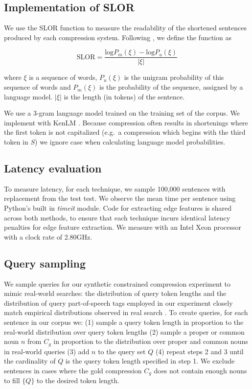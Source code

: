 \subsection{Implementation of SLOR}

We use the SLOR function to measure the readability of the shortened sentences produced by each compression system. Following \cite{lau2015unsupervised}, we define the function as 

\begin{equation}
\text{SLOR}=\frac{\text{log}P_m(\xi) - \text{log}P_u(\xi)}{|\xi|}
\end{equation}

where $\xi$ is a sequence of words, $P_u(\xi)$ is the unigram probability of this sequence of words and $P_m(\xi)$ is the probability of the sequence, assigned by a language model.  $|\xi|$ is the length (in tokens) of the sentence.

We use a 3-gram language model trained on the training set of the \citet{filippova2013overcoming} corpus. We implement with KenLM \cite{Heafield-kenlm}. Because compression often results in shortenings where the first token is not capitalized (e.g.\ a compression which begins with the third token in $S$) we ignore case when calculating language model probabilities.

\subsection{Latency evaluation}
To measure latency, for each technique, we sample 100,000 sentences with replacement from the test test. We observe the mean time per sentence using Python's built in \textit{timeit} module. Code for extracting edge features is shared across both methods, to ensure that each technique incurs identical latency penalties for edge feature extraction. We measure with an Intel Xeon processor with a clock rate of 2.80GHz. 

\subsection{Query sampling}
We sample queries for our synthetic constrained compression experiment to mimic real-world searches: the distribution of query token lengths and the distribution of query part-of-speech tags employed in our experiment closely match empirical distributions observed in real search \cite{Jansen2000RealLR,Barr2008TheLS}. To create queries, for each sentence in our corpus we: (1) sample a query token length in proportion to the real-world distribution over query token lengths (2) sample a proper or common noun $n$ from $C_g$ in proportion to the distribution over proper and common nouns in real-world queries (3) add $n$ to the query set $Q$ (4) repeat steps 2 and 3 until the cardinality of $Q$ is the query token length specified in step 1. We exclude sentences in cases where the gold compression $C_g$ does not contain enough nouns to fill $\{Q\}$ to the desired token length.

